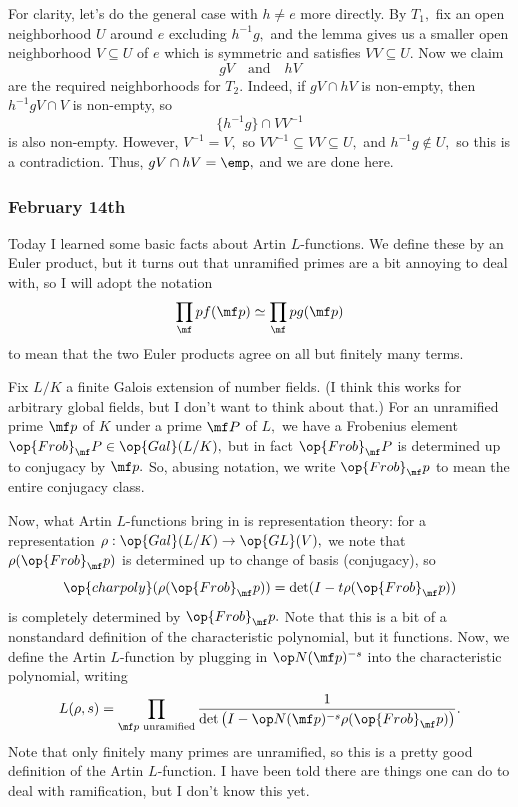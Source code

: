 For clarity, let's do the general case with $h\ne e$ more directly. By $T_1,$ fix an open neighborhood $U$ around $e$ excluding $h^{-1}g,$ and the lemma gives us a smaller open neighborhood $V\subseteq U$ of $e$ which is symmetric and satisfies $VV\subseteq U.$ Now we claim
\[gV\quad\text{and}\quad hV\]
are the required neighborhoods for $T_2.$ Indeed, if $gV\cap hV$ is non-empty, then $h^{-1}gV\cap V$ is non-empty, so
\[\{h^{-1}g\}\cap VV^{-1}\]
is also non-empty. However, $V^{-1}=V,$ so $VV^{-1}\subseteq VV\subseteq U,$ and $h^{-1}g\notin U,$ so this is a contradiction. Thus, $gV\cap hV=\emp,$ and we are done here.

\subsubsection{February 14th}
Today I learned some basic facts about Artin $L$-functions. We define these by an Euler product, but it turns out that unramified primes are a bit annoying to deal with, so I will adopt the notation
\[\prod_\mf pf(\mf p)\simeq\prod_\mf pg(\mf p)\]
to mean that the two Euler products agree on all but finitely many terms.

Fix $L/K$ a finite Galois extension of number fields. (I think this works for arbitrary global fields, but I don't want to think about that.) For an unramified prime $\mf p$ of $K$ under a prime $\mf P$ of $L,$ we have a Frobenius element $\op{Frob}_\mf P\in\op{Gal}(L/K),$ but in fact $\op{Frob}_\mf P$ is determined up to conjugacy by $\mf p.$ So, abusing notation, we write $\op{Frob}_\mf p$ to mean the entire conjugacy class.

Now, what Artin $L$-functions bring in is representation theory: for a representation $\rho:\op{Gal}(L/K)\to\op{GL}(V),$ we note that $\rho(\op{Frob}_\mf p)$ is determined up to change of basis (conjugacy), so
\[\op{charpoly}(\rho(\op{Frob}_\mf p))=\det(I-t\rho(\op{Frob}_\mf p))\]
is completely determined by $\op{Frob}_\mf p.$ Note that this is a bit of a nonstandard definition of the characteristic polynomial, but it functions. Now, we define the Artin $L$-function by plugging in $\op N(\mf p)^{-s}$ into the characteristic polynomial, writing
\[L(\rho,s)=\prod_{\mf p\text{ unramified}}\frac1{\det\left(I-\op N(\mf p)^{-s}\rho(\op{Frob}_\mf p)\right)}.\]
Note that only finitely many primes are unramified, so this is a pretty good definition of the Artin $L$-function. I have been told there are things one can do to deal with ramification, but I don't know this yet.

